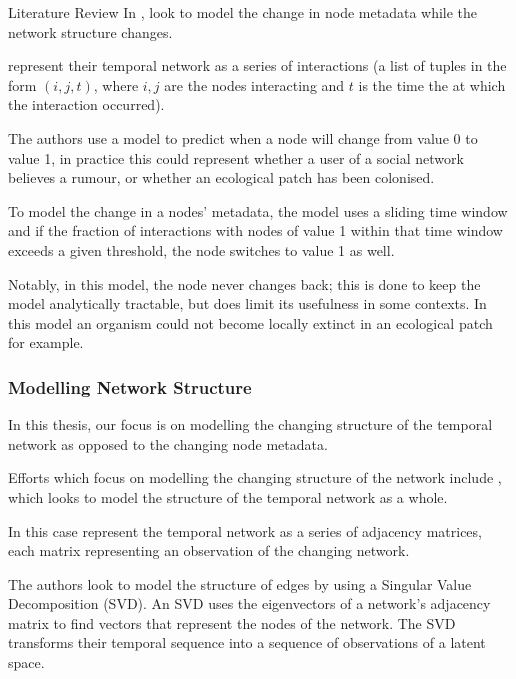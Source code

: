\documentclass[12pt]{amsbook}
\begin{document}
\begin{chapter}{Literature Review}
            In \cite{KARIMI20133476},  look to model the change in node metadata while the network structure changes. 
            
             represent their temporal network as a series of interactions (a list of tuples in the form $(i,j,t)$, where $i,j$ are the nodes interacting and $t$ is the time the at which the interaction occurred). 
            
            The authors use a model to predict when a node will change from value 0 to value 1, in practice this could represent whether a user of a social network believes a rumour, or whether an ecological patch has been colonised. 
            
            To model the change in a nodes' metadata, the model uses a sliding time window and if the fraction of interactions with nodes of value 1 within that time window exceeds a given threshold, the node switches to value 1 as well. 

            Notably, in this model, the node never changes back; this is done to keep the model analytically tractable, but does limit its usefulness in some contexts. In this model an organism could not become locally extinct in an ecological patch for example. 


        \subsubsection{Modelling Network Structure}
            In this thesis, our focus is on modelling the changing structure of the temporal network as opposed to the changing node metadata.

            Efforts which focus on modelling the changing structure of the network include \cite{sanna2021link}, which looks to model the structure of the temporal network as a whole.
            
            In this case  represent the temporal network as a series of adjacency matrices, each matrix representing an observation of the changing network. 
            
            The authors look to model the structure of edges by using a Singular Value Decomposition (SVD). An SVD uses the eigenvectors of a network's adjacency matrix to find vectors that represent the nodes of the network. The SVD transforms their temporal sequence into a sequence of observations of a latent space. 
            

\end{chapter}
\end{document}

